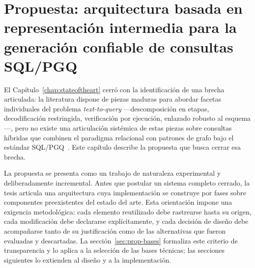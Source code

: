 %
%

\chapter{Propuesta: arquitectura basada en representación intermedia para la generación confiable de consultas SQL/PGQ}
\label{chap:proposal}

El Capítulo~\ref{chap:stateoftheart} cerró con la identificación de una brecha articulada: la literatura dispone de piezas maduras para abordar facetas individuales del problema \emph{text-to-query} ---descomposición en etapas, decodificación restringida, verificación por ejecución, enlazado robusto al esquema---, pero no existe una articulación sistémica de estas piezas sobre consultas híbridas que combinen el paradigma relacional con patrones de grafo bajo el estándar \ac{SQL}/\ac{PGQ}~\cite{ISO9075_16_2023}. Este capítulo describe la propuesta que busca cerrar esa brecha.

La propuesta se presenta como un trabajo de naturaleza experimental y deliberadamente incremental. Antes que postular un sistema completo cerrado, la tesis articula una arquitectura cuya implementación se construye por fases sobre componentes preexistentes del estado del arte. Esta orientación impone una exigencia metodológica: cada elemento reutilizado debe rastrearse hasta su origen, cada modificación debe declararse explícitamente, y cada decisión de diseño debe acompañarse tanto de su justificación como de las alternativas que fueron evaluadas y descartadas. La sección~\ref{sec:prop-bases} formaliza este criterio de transparencia y lo aplica a la selección de las bases técnicas; las secciones siguientes lo extienden al diseño y a la implementación.

